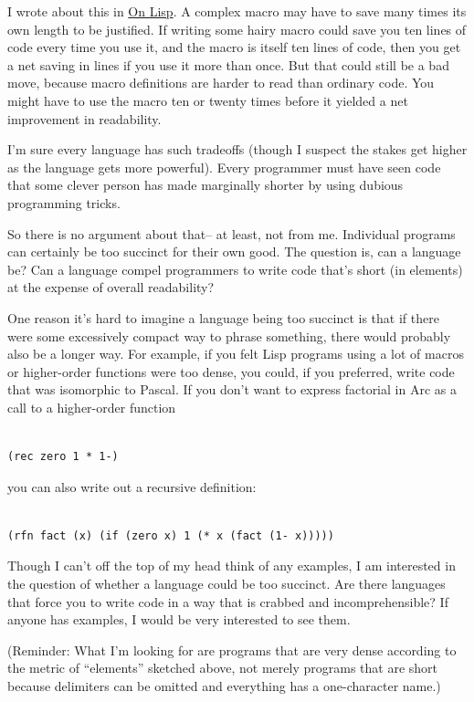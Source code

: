 \documentclass[12pt]{book}
\begin{document}
I wrote about this in \href{onlisp.html}{On Lisp}. A complex macro may
have to save many times its own length to be justified. If writing some
hairy macro could save you ten lines of code every time you use it, and
the macro is itself ten lines of code, then you get a net saving in
lines if you use it more than once. But that could still be a bad move,
because macro definitions are harder to read than ordinary code. You
might have to use the macro ten or twenty times before it yielded a net
improvement in readability.

I'm sure every language has such tradeoffs (though I suspect the stakes
get higher as the language gets more powerful). Every programmer must
have seen code that some clever person has made marginally shorter by
using dubious programming tricks.

So there is no argument about that-- at least, not from me. Individual
programs can certainly be too succinct for their own good. The question
is, can a language be? Can a language compel programmers to write code
that's short (in elements) at the expense of overall readability?

One reason it's hard to imagine a language being too succinct is that if
there were some excessively compact way to phrase something, there would
probably also be a longer way. For example, if you felt Lisp programs
using a lot of macros or higher-order functions were too dense, you
could, if you preferred, write code that was isomorphic to Pascal. If
you don't want to express factorial in Arc as a call to a higher-order
function

\begin{verbatim}

(rec zero 1 * 1-)
\end{verbatim}

you can also write out a recursive definition:

\begin{verbatim}

(rfn fact (x) (if (zero x) 1 (* x (fact (1- x)))))
\end{verbatim}

Though I can't off the top of my head think of any examples, I am
interested in the question of whether a language could be too succinct.
Are there languages that force you to write code in a way that is
crabbed and incomprehensible? If anyone has examples, I would be very
interested to see them.

(Reminder: What I'm looking for are programs that are very dense
according to the metric of ``elements'' sketched above, not merely
programs that are short because delimiters can be omitted and everything
has a one-character name.)
\end{document}

